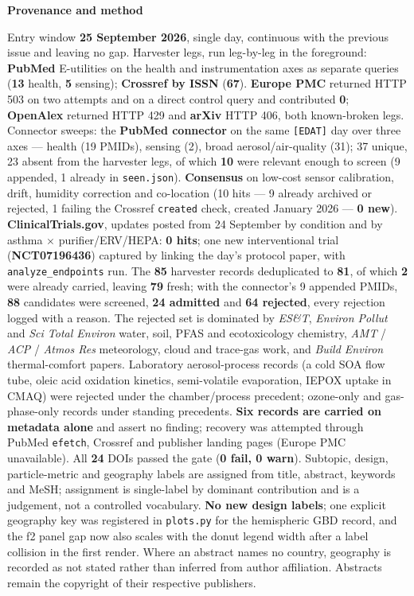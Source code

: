 \documentclass[10pt]{article}
\begin{document}
\begin{keybox}
{\sffamily\bfseries\footnotesize\color{Deep}Provenance and method}\\[1.2mm]
{\fontsize{7.2}{8.8}\selectfont
Entry window \textbf{25 September 2026}, single day, continuous with the previous issue and
leaving no gap. Harvester legs, run leg-by-leg in the foreground: \textbf{PubMed} E-utilities
on the health and instrumentation axes as separate queries (\textbf{13} health, \textbf{5}
sensing); \textbf{Crossref by ISSN} (\textbf{67}). \textbf{Europe PMC} returned HTTP 503 on two
attempts and on a direct control query and contributed \textbf{0}; \textbf{OpenAlex} returned
HTTP 429 and \textbf{arXiv} HTTP 406, both known-broken legs. Connector sweeps: the
\textbf{PubMed connector} on the same \texttt{[EDAT]} day over three axes --- health (19 PMIDs),
sensing (2), broad aerosol/air-quality (31); 37 unique, 23 absent from the harvester legs, of
which \textbf{10} were relevant enough to screen (9 appended, 1 already in \texttt{seen.json}).
\textbf{Consensus} on low-cost sensor calibration, drift, humidity correction and co-location
(10 hits --- 9 already archived or rejected, 1 failing the Crossref \texttt{created} check,
created January 2026 --- \textbf{0 new}). \textbf{ClinicalTrials.gov}, updates posted from
24 September by condition and by asthma $\times$ purifier/ERV/HEPA: \textbf{0 hits}; one new
interventional trial (\textbf{NCT07196436}) captured by linking the day's protocol paper, with
\texttt{analyze\_endpoints} run.
The \textbf{85} harvester records deduplicated to \textbf{81}, of which \textbf{2} were already
carried, leaving \textbf{79} fresh; with the connector's 9 appended PMIDs, \textbf{88}
candidates were screened, \textbf{24 admitted} and \textbf{64 rejected}, every rejection logged
with a reason. The rejected set is dominated by \textit{ES\&T}, \textit{Environ Pollut} and
\textit{Sci Total Environ} water, soil, PFAS and ecotoxicology chemistry, \textit{AMT} /
\textit{ACP} / \textit{Atmos Res} meteorology, cloud and trace-gas work, and \textit{Build
Environ} thermal-comfort papers. Laboratory aerosol-process records (a cold SOA flow tube, oleic
acid oxidation kinetics, semi-volatile evaporation, IEPOX uptake in CMAQ) were rejected under
the chamber/process precedent; ozone-only and gas-phase-only records under standing precedents.
\textbf{Six records are carried on metadata alone} and assert no finding; recovery was attempted
through PubMed \texttt{efetch}, Crossref and publisher landing pages (Europe PMC unavailable).
All \textbf{24} DOIs passed the gate (\textbf{0 fail, 0 warn}).
Subtopic, design, particle-metric and geography labels are assigned from title, abstract,
keywords and MeSH; assignment is single-label by dominant contribution and is a judgement, not a
controlled vocabulary. \textbf{No new design labels}; one explicit geography key was registered
in \texttt{plots.py} for the hemispheric GBD record, and the f2 panel gap now also scales with
the donut legend width after a label collision in the first render. Where an abstract names no
country, geography is recorded as not stated rather than inferred from author affiliation.
Abstracts remain the copyright of their respective publishers.\par}
\end{keybox}
\end{document}
